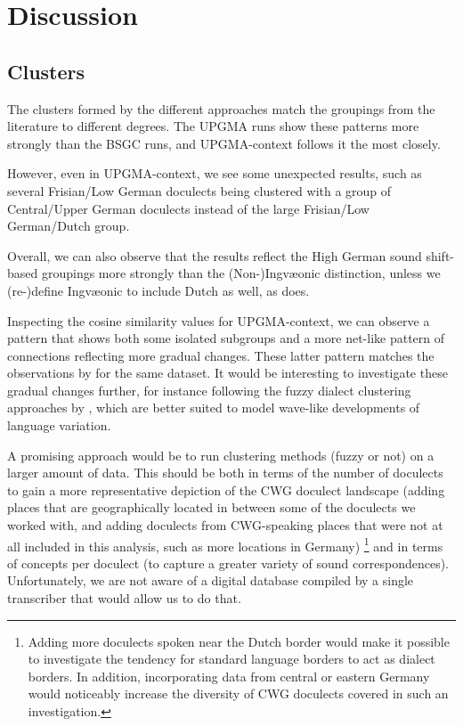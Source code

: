 \documentclass[a4paper]{article}
\begin{document}
\section{Discussion}
\label{sec:discussion}

\subsection{Clusters}
The clusters formed by the different approaches
match the groupings from the literature to different degrees.
The UPGMA runs show these patterns more strongly than the BSGC runs,
and UPGMA-context follows it the most closely.

However, even in UPGMA-context,
we see some unexpected results,
such as several Frisian/Low German doculects
being clustered with a group of Central/Upper German doculects
instead of the large Frisian/Low German/Dutch group.

Overall, we can also observe that the results reflect
the High German sound shift-based groupings more
strongly than the (Non-)Ingv\ae{}onic distinction,
unless we (re-)define Ingv\ae{}onic to include Dutch as well,
as \citet{sonderegger1979grundzuege} does.

Inspecting the cosine similarity values
for UPGMA-context, we can observe a pattern
that shows both some isolated subgroups and
a more net-like pattern of connections
reflecting more gradual changes.
These latter pattern matches the observations
by \citet{heggarty2010splits} for the same dataset.
It would be interesting to investigate these gradual changes further,
for instance following the fuzzy dialect clustering approaches
by \citet{proell2013detecting}, which are better suited to model
wave-like developments of language variation.

A promising approach would be to run
clustering methods (fuzzy or not) on a larger amount of data.
This should be both in terms of the number of doculects
to gain a more representative depiction of the CWG doculect landscape
(adding places that are geographically located
in between some of the doculects we worked with,
and adding doculects from CWG-speaking places that
were not at all included in this analysis,
such as more locations in Germany)%
\footnote{%
Adding more doculects spoken near the Dutch border
would make it possible to investigate the tendency for
standard language borders to act as dialect borders.
In addition, incorporating data from central or eastern
Germany would noticeably increase the diversity of CWG doculects
covered in such an investigation.
}
and in terms of concepts per doculect
(to capture a greater variety of sound correspondences).
Unfortunately, we are not aware of
a digital database compiled by a single transcriber that
would allow us to do that.
\end{document}
